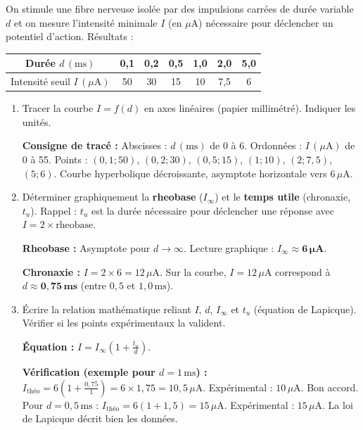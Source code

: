 \documentclass[11pt]{article}
\begin{document}
\begin{exercice}
On stimule une fibre nerveuse isolée par des impulsions carrées de durée variable $d$ et on mesure l'intensité minimale $I$ (en $\mu\text{A}$) nécessaire pour déclencher un potentiel d'action. Résultats :

\begin{center}
\begin{tabular}{|c|c|c|c|c|c|c|}\hline
Durée $d\,(\text{ms})$ & 0,1 & 0,2 & 0,5 & 1,0 & 2,0 & 5,0 \\ \hline
Intensité seuil $I\,(\mu\text{A})$ & 50 & 30 & 15 & 10 & 7,5 & 6 \\ \hline
\end{tabular}
\end{center}

\begin{enumerate}
\item Tracer la courbe $I = f(d)$ en axes linéaires (papier millimétré). Indiquer les unités.
\par \textbf{Consigne de tracé :} Abscisses : $d\,(\text{ms})$ de 0 à 6. Ordonnées : $I\,(\mu\text{A})$ de 0 à 55. Points : $(0,1; 50)$, $(0,2; 30)$, $(0,5; 15)$, $(1; 10)$, $(2; 7,5)$, $(5; 6)$. Courbe hyperbolique décroissante, asymptote horizontale vers $6\,\mu\text{A}$.
\item Déterminer graphiquement la \textbf{rheobase} ($I_{\infty}$) et le \textbf{temps utile} (chronaxie, $t_u$). Rappel : $t_u$ est la durée nécessaire pour déclencher une réponse avec $I = 2 \times \text{rheobase}$.
\par \textbf{Rheobase :} Asymptote pour $d \to \infty$. Lecture graphique : $I_{\infty} \approx \mathbf{6\,\mu\text{A}}$.
\par \textbf{Chronaxie :} $I = 2 \times 6 = 12\,\mu\text{A}$. Sur la courbe, $I=12\,\mu\text{A}$ correspond à $d \approx \mathbf{0,75\,\text{ms}}$ (entre $0,5$ et $1,0\,\text{ms}$).
\item Écrire la relation mathématique reliant $I$, $d$, $I_{\infty}$ et $t_u$ (équation de Lapicque). Vérifier si les points expérimentaux la valident.
\par \textbf{Équation :} $I = I_{\infty} \left(1 + \frac{t_u}{d}\right)$.
\par \textbf{Vérification (exemple pour $d=1\,\text{ms}$) :} $I_{\text{théo}} = 6 \left(1 + \frac{0,75}{1}\right) = 6 \times 1,75 = 10,5\,\mu\text{A}$. Expérimental : $10\,\mu\text{A}$. Bon accord. Pour $d=0,5\,\text{ms}$ : $I_{\text{théo}} = 6(1+1,5) = 15\,\mu\text{A}$. Expérimental : $15\,\mu\text{A}$. La loi de Lapicque décrit bien les données.

\end{enumerate}
\end{exercice}
\end{document}
